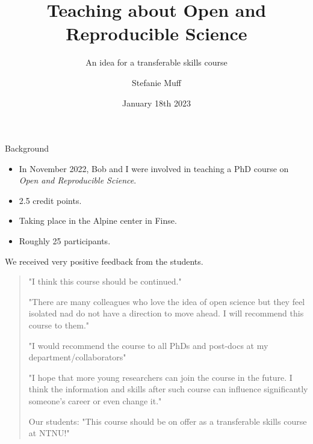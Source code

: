 \documentclass[
  10pt,
  ignorenonframetext,
]{beamer}
\title{Teaching about Open and Reproducible Science}
\subtitle{An idea for a transferable skills course}
\author{Stefanie Muff}
\date{January 18th 2023}
\providecommand{\tightlist}{%
  \setlength{\itemsep}{0pt}\setlength{\parskip}{0pt}}
\begin{document}
\frame{\titlepage}

\begin{frame}{Background}
\protect\hypertarget{background}{}
\(~\)

\begin{itemize}
\tightlist
\item
  In November 2022, Bob and I were involved in teaching a PhD course on
  \emph{Open and Reproducible Science}.
\end{itemize}

\vspace{2mm}

\begin{itemize}
\tightlist
\item
  2.5 credit points.
\end{itemize}

\vspace{2mm}

\begin{itemize}
\tightlist
\item
  Taking place in the Alpine center in Finse.
\end{itemize}

\vspace{2mm}

\begin{itemize}
\tightlist
\item
  Roughly 25 participants.
\end{itemize}
\end{frame}

\begin{frame}
We received very positive feedback from the students.

\vspace{4mm}

\begin{quote}

 "I think this course should be continued."
 
 \vspace{2mm}

 "There are many colleagues who love the idea of open science but they feel isolated nad do not have a direction to move ahead. I will recommend this course to them."
 
  \vspace{2mm}

 "I would recommend the course to all PhDs and post-docs at my department/collaborators"
 
 \vspace{2mm}
 
 "I hope that more young researchers can join the course in the future. I think the information and skills after such course can influence significantly someone's career or even change it."
 
  \vspace{2mm}
  
  Our students: "This course should be on offer as a transferable skills course at NTNU!" 

\end{quote}
\end{frame}
\end{document}

